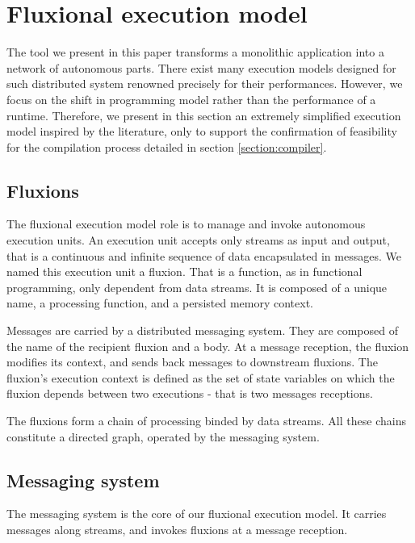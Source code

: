 \section{Fluxional execution model} \label{section:model}

The tool we present in this paper transforms a monolithic application into a network of autonomous parts.
There exist many execution models designed for such distributed system renowned precisely for their performances.
However, we focus on the shift in programming model rather than the performance of a runtime.
Therefore, we present in this section an extremely simplified execution model inspired by the literature\cite{Welsh2000}\cite{Jain2006,Wu2007}\cite{Zaharia2010}\cite{Akidau2013}\cite{Marz2011}, only to support the confirmation of feasibility for the compilation process detailed in section \ref{section:compiler}.

\subsection{Fluxions}

The fluxional execution model role is to manage and invoke autonomous execution units.
An execution unit accepts only streams as input and output, that is a continuous and infinite sequence of data encapsulated in messages.
We named this execution unit a fluxion.
That is a function, as in functional programming, only dependent from data streams.
It is composed of a unique name, a processing function, and a persisted memory context.

Messages are carried by a distributed messaging system.
They are composed of the name of the recipient fluxion and a body.
At a message reception, the fluxion modifies its context, and sends back messages to downstream fluxions.
The fluxion's execution context is defined as the set of state variables on which the fluxion depends between two executions - that is two messages receptions.

The fluxions form a chain of processing binded by data streams.
All these chains constitute a directed graph, operated by the messaging system.

\subsection{Messaging system}

The messaging system is the core of our fluxional execution model.
It carries messages along streams, and invokes fluxions at a message reception.

